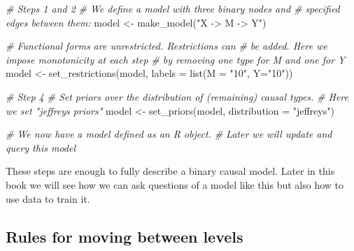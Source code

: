 \documentclass[
  12pt,
]{book}
\newenvironment{Shaded}{\begin{snugshade}}{\end{snugshade}}
\newcommand{\AttributeTok}[1]{\textcolor[rgb]{0.77,0.63,0.00}{#1}}
\newcommand{\CommentTok}[1]{\textcolor[rgb]{0.56,0.35,0.01}{\textit{#1}}}
\newcommand{\FunctionTok}[1]{\textcolor[rgb]{0.00,0.00,0.00}{#1}}
\newcommand{\NormalTok}[1]{#1}
\newcommand{\OtherTok}[1]{\textcolor[rgb]{0.56,0.35,0.01}{#1}}
\newcommand{\StringTok}[1]{\textcolor[rgb]{0.31,0.60,0.02}{#1}}
\begin{document}
\begin{Shaded}
\begin{Highlighting}[]
\CommentTok{\# Steps 1 and 2 }
\CommentTok{\# We define a model with three binary nodes and }
\CommentTok{\# specified edges between them:}
\NormalTok{model }\OtherTok{\textless{}{-}} \FunctionTok{make\_model}\NormalTok{(}\StringTok{"X {-}\textgreater{} M {-}\textgreater{} Y"}\NormalTok{)}

\CommentTok{\# Functional forms are unrestricted. Restrictions can }
\CommentTok{\# be added. Here we impose monotonicity at each step }
\CommentTok{\# by removing one type for M and one for Y}
\NormalTok{model }\OtherTok{\textless{}{-}} \FunctionTok{set\_restrictions}\NormalTok{(model, }\AttributeTok{labels =} \FunctionTok{list}\NormalTok{(}\AttributeTok{M =} \StringTok{"10"}\NormalTok{, }\AttributeTok{Y=}\StringTok{"10"}\NormalTok{))}

\CommentTok{\# Step 4}
\CommentTok{\# Set priors over the distribution of (remaining) causal types.}
\CommentTok{\# Here we set "jeffreys priors"}
\NormalTok{model }\OtherTok{\textless{}{-}} \FunctionTok{set\_priors}\NormalTok{(model, }\AttributeTok{distribution =} \StringTok{"jeffreys"}\NormalTok{)}

\CommentTok{\# We now have a model defined as an R object. }
\CommentTok{\# Later we will update  and query this model}
\end{Highlighting}
\end{Shaded}

These steps are enough to fully describe a binary causal model. Later in this book we will see how we can ask questions of a model like this but also how to use data to train it.

\hypertarget{rules-for-moving-between-levels}{%
\subsection{Rules for moving between levels}\label{rules-for-moving-between-levels}}
\end{document}
